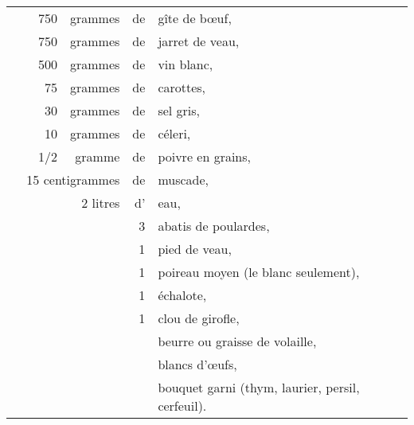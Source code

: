 \footnotesize
\begin{longtable}{rrrrrp{18em}}
 & \hspace{2em} &   750 & grammes  & de & gîte de bœuf,                                                   \\
 & \hspace{2em} &   750 & grammes  & de & jarret de veau,                                                 \\
 & \hspace{2em} &   500 & grammes  & de & vin blanc,                                                      \\
 & \hspace{2em} &    75 & grammes  & de & carottes,                                                       \\
 & \hspace{2em} &    30 & grammes  & de & sel gris,                                                       \\
 & \hspace{2em} &    10 & grammes  & de & céleri,                                                         \\
 & \hspace{2em} &   1/2 & gramme   & de & poivre en grains,                                               \\
 & \multicolumn{3}{r}{15 centigrammes} & de & muscade,                                                    \\
 & \hspace{2em} &       & 2 litres & d' & eau,                                                            \\
 & \hspace{2em} &       &          &  3 & abatis de poulardes,                                            \\
 & \hspace{2em} &       &          &  1 & pied de veau,                                                   \\
 & \hspace{2em} &       &          &  1 & poireau moyen (le blanc seulement),                             \\
 & \hspace{2em} &       &          &  1 & échalote,                                                       \\
 & \hspace{2em} &       &          &  1 & clou de girofle,                                                \\
 & \hspace{2em} &       &          &    & beurre ou graisse de volaille,                                  \\
 & \hspace{2em} &       &          &    & blancs d'œufs,                                                  \\
 & \hspace{2em} &       &          &    & bouquet garni (thym, laurier, persil, cerfeuil).                \\
\end{longtable}
\normalsize

